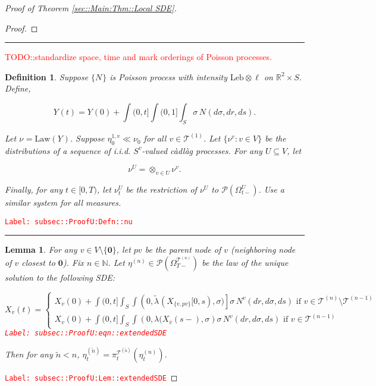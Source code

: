 \documentclass[12pt]{article}
\newcommand{\mb}{\mathbb}
\newcommand{\mc}{\mathcal}
\newcommand{\ov}{\overline}
\newcommand{\te}{\text}
\newcommand{\tr}{\textcolor{red}}
\newcommand{\labe}[1]{\tr{\texttt{Label: #1}}}
\newcommand{\lin}{\rule{\linewidth}{0.4 pt}}
\newcommand{\pmsr}{\mc{P}}							%
\renewcommand{\root}{\mathbf{0}}				%
\renewcommand{\v}{v}							%
\renewcommand{\U}{U}							%
\renewcommand{\S}{S}							%
\newcommand{\s}{\sigma}							%
\newcommand{\T}{T}								%
\renewcommand{\t}{t}							%
\newcommand{\sset}{\Omega}						%
\newcommand{\proj}{\pi}							%
\renewcommand{\tt}{s}							%
\newcommand{\X}{X}								%
\newcommand{\vind}[1]{^{#1}}					%
\newcommand{\carp}[1]{^{#1}}					%
\newcommand{\vsi}[1]{^{#1}}						%
\newcommand{\cind}[1]{_{#1}}					%
\newcommand{\cl}{\ov}							%
\newcommand{\tp}[1]{(#1)}						%
\newcommand{\tip}[1]{#1}						%
\newcommand{\ts}[1]{_{#1}}						%
\newcommand{\slnvind}[2]{^{#1,#2}}				%
\newcommand{\tree}{\mc{T}}						%
\newcommand{\sln}[1]{^{(#1)}}					%
\newcommand{\poiss}{N}							%
\newcommand{\leb}{\te{Leb}}						%
\newcommand{\Sm}{\ell}							%
\newcommand{\rate}{\lambda}						%
\renewcommand{\r}{r}							%
\newcommand{\alt}[1]{\widetilde{#1}}			%
\newcommand{\mm}{\nu}							%
\newcommand{\mmm}{\eta}							%
\newcommand{\law}{\te{Law}}						%
\newcommand{\XX}{Y}								%
\newcommand{\crate}{\alt{\lambda}}				%
\newcommand{\p}{p}								%
\newtheorem{lem}[thms]{Lemma}
\newtheorem{defn}[thms]{Definition}
\begin{document}
\begin{proof}[Proof of Theorem \ref{sec::Main:Thm::Local SDE}]
\begin{proof}
\end{proof}

\lin

\tr{TODO::standardize space, time and mark orderings of Poisson processes.}

\begin{defn}
Suppose \(\{\poiss\vind{}\}\) is Poisson process with intensity \(\leb\otimes \Sm\) on \(\mb{R}^2\times \S\). Define,

\[\XX\cind{}\tp{\t} = \XX\cind{}\tp{0} + \int{(0,\t]}\int{(0,1]}\int_\S\s\,\poiss\vind{}(d\s,d\r,d\tt).\]

Let \(\mm\vind{}\ts{} = \law(\XX\cind{}\tip{})\). Suppose \(\mmm\slnvind{1}{\v}\ts{0}\ll\mm\vind{}\ts{0}\) for all \(\v\in\tree\sln{1}\). Let \(\{\mm\vind{\v}\ts{}:\v\in V\}\) be the distributions of a sequence of i.i.d. \(\S\carp{\v}\)-valued c\`adl\`ag processes. For any \(\U\subseteq V\), let 

\[\mm\vind{\U}\ts{} = \otimes_{\v\in\U} \mm\vind{\v}\ts{}.\]

Finally, for any \(\t\in [0,\T)\), let \(\mm\vind{\U}\ts{\t}\) be the restriction of \(\mm\vind{\U}\ts{}\) to \(\pmsr(\sset\vsi{\U}\ts{\t-})\). Use a similar system for all measures.
\label{subsec::ProofU:Defn::nu}
\end{defn}
\labe{subsec::ProofU:Defn::nu}

\lin

\begin{lem}
For any \(\v \in V\setminus\{\root\}\), let \(\p{\v}\) be the parent node of \(\v\) (neighboring node of \(\v\) closest to \(\root\)). Fix \(n \in \mb{N}\). Let \(\mmm\sln{n}\ts{} \in \pmsr\left(\sset\vsi{\tree\sln{n}}\ts{\T-}\right)\) be the law of the unique solution to the following SDE:

\begin{equation}
\X\cind{\v}\tp{\t} = \begin{cases}
\X\cind{\v}\tp{0} + \int{(0,\t]}\int_\S\int{\left(0,\crate\vind{}\ts{}(\X\cind{\{\v,\p{\v}\}}\tip{[0,\tt)},\s)\right]}\s\,\poiss\vind{\v}(d\r,d\s,d\tt)\te{ if } \v \in \tree\sln{n}\setminus \tree\sln{n-1}\\
\X\cind{\v}\tp{0} + \int{(0,\t]}\int_\S\int{\left(0,\rate(\X\cind{\cl{\v}}\tp{\tt-},\s\right)}\s\,\poiss\vind{\v}(d\r,d\s,d\tt)\te{ if } \v \in \tree\sln{n-1}
\end{cases}
\label{subsec::ProofU:eqn::extendedSDE}
\end{equation}
\labe{subsec::ProofU:eqn::extendedSDE}

Then for any \(\alt{n} < n\), \(\mmm\sln{\alt{n}}\ts{\t} = \proj\vsi{\tree\sln{\alt{n}}}\ts{\t}(\mmm\sln{n}\ts{\t})\).
\label{subsec::ProofU:Lem::extendedSDE}
\end{lem}
\labe{subsec::ProofU:Lem::extendedSDE}


\end{proof}
\end{document}
